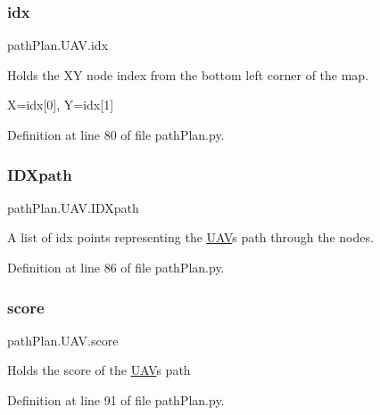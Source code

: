 \subsubsection{\texorpdfstring{idx}{idx}}
{\footnotesize\ttfamily path\+Plan.\+U\+A\+V.\+idx}



Holds the XY node index from the bottom left corner of the map. 

X=idx\mbox{[}0\mbox{]}, Y=idx\mbox{[}1\mbox{]} 

Definition at line 80 of file path\+Plan.\+py.

\mbox{\label{classpath_plan_1_1_u_a_v_a640c0f9f8385d53e0742d9ef5f3a7a59}} 
\subsubsection{\texorpdfstring{I\+D\+Xpath}{IDXpath}}
{\footnotesize\ttfamily path\+Plan.\+U\+A\+V.\+I\+D\+Xpath}



A list of idx points representing the \mbox{\hyperlink{classpath_plan_1_1_u_a_v}{U\+AV}}\textquotesingle{}s path through the nodes. 



Definition at line 86 of file path\+Plan.\+py.

\mbox{\label{classpath_plan_1_1_u_a_v_a5f9c3173062f490e98024972e954cb1c}} 
\subsubsection{\texorpdfstring{score}{score}}
{\footnotesize\ttfamily path\+Plan.\+U\+A\+V.\+score}



Holds the score of the \mbox{\hyperlink{classpath_plan_1_1_u_a_v}{U\+AV}}\textquotesingle{}s path 



Definition at line 91 of file path\+Plan.\+py.

\mbox{\label{classpath_plan_1_1_u_a_v_a998af53f0d27f93e5ad949a09710f995}} 
